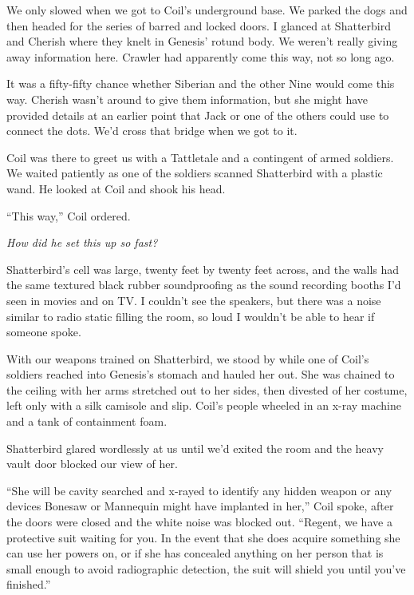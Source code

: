 We only slowed when we got to Coil's underground base.  We parked the dogs and then headed for the series of barred and locked doors.  I glanced at Shatterbird and Cherish where they knelt in Genesis' rotund body.  We weren't really giving away information here. Crawler had apparently come this way, not so long ago.



It was a fifty-fifty chance whether Siberian and the other Nine would come this way.  Cherish wasn't around to give them information, but she might have provided details at an earlier point that Jack or one of the others could use to connect the dots.  We'd cross that bridge when we got to it.



Coil was there to greet us with a Tattletale and a contingent of armed soldiers.  We waited patiently as one of the soldiers scanned Shatterbird with a plastic wand.  He looked at Coil and shook his head.



``This way,'' Coil ordered.



\emph{How did he set this up so fast?}



Shatterbird's cell was large, twenty feet by twenty feet across, and the walls had the same textured black rubber soundproofing as the sound recording booths I'd seen in movies and on TV.  I couldn't see the speakers, but there was a noise similar to radio static filling the room, so loud I wouldn't be able to hear if someone spoke.



With our weapons trained on Shatterbird, we stood by while one of Coil's soldiers reached into Genesis's stomach and hauled her out.  She was chained to the ceiling with her arms stretched out to her sides, then divested of her costume, left only with a silk camisole and slip.  Coil's people wheeled in an x-ray machine and a tank of containment foam.



Shatterbird glared wordlessly at us until we'd exited the room and the heavy vault door blocked our view of her.



``She will be cavity searched and x-rayed to identify any hidden weapon or any devices Bonesaw or Mannequin might have implanted in her,'' Coil spoke, after the doors were closed and the white noise was blocked out.  ``Regent, we have a protective suit waiting for you.  In the event that she does acquire something she can use her powers on, or if she has concealed anything on her person that is small enough to avoid radiographic detection, the suit will shield you until you've finished.''



